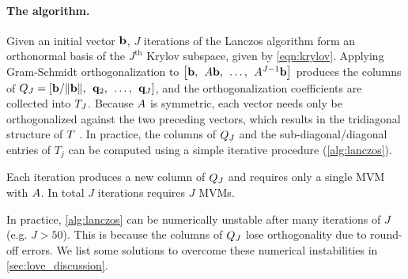 \paragraph{The algorithm.}
Given an initial vector $\mathbf{b}$, $J$ iterations of the Lanczos algorithm form an orthonormal basis of the $J^\text{th}$ Krylov subspace, given by \cref{eqn:krylov}.
Applying Gram-Schmidt orthogonalization to $\left[ \mathbf{b}, \:\: A \mathbf{b}, \:\: \ldots, \:\: A^{J-1} \mathbf{b} \right]$ produces the columns of $Q_J = \left[ \mathbf{b}/\Vert \mathbf{b} \Vert, \:\: \mathbf{q}_2, \:\: \ldots, \:\: \mathbf{q}_J \right]$, and the orthogonalization coefficients are collected into $T_J$.
Because $A$ is symmetric, each vector needs only be orthogonalized against the two preceding vectors, which results in the tridiagonal structure of $T$ \cite{golub2012matrix}.
In practice, the columns of $Q_J$ and the sub-diagonal/diagonal entries of $T_j$ can be computed using a simple iterative procedure (\cref{alg:lanczos}).
%

%
Each iteration produces a new column of $Q_J$ and requires only a single MVM with $A$.
In total $J$ iterations requires $J$ MVMs.

In practice, \cref{alg:lanczos} can be numerically unstable after many iterations of $J$ (e.g. $J > 50$).
This is because the columns of $Q_J$ lose orthogonality due to round-off errors.
We list some solutions to overcome these numerical instabilities in \cref{sec:love_discussion}.




